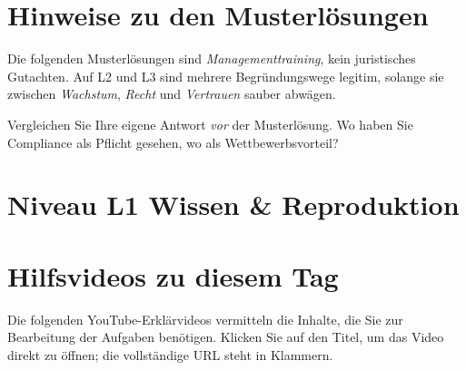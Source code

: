 \documentclass[11pt,a4paper,oneside]{article}
\begin{document}
\section*{Hinweise zu den Musterlösungen}
\thispagestyle{plain}

\noindent Die folgenden Musterlösungen sind \emph{Managementtraining}, kein juristisches Gutachten. Auf L2 und L3 sind mehrere Begründungswege legitim, solange sie zwischen \emph{Wachstum}, \emph{Recht} und \emph{Vertrauen} sauber abwägen.

\begin{infobox}
Vergleichen Sie Ihre eigene Antwort \emph{vor} der Musterlösung. Wo haben Sie Compliance als Pflicht gesehen, wo als Wettbewerbsvorteil?
\end{infobox}

\clearpage

\section*{Niveau L1 \textendash{} Wissen \& Reproduktion}

\section*{Hilfsvideos zu diesem Tag}
\thispagestyle{plain}

\noindent Die folgenden YouTube-Erkl\"arvideos vermitteln die Inhalte, die Sie zur Bearbeitung der Aufgaben ben\"otigen. Klicken Sie auf den Titel, um das Video direkt zu \"offnen; die vollst\"andige URL steht in Klammern.
\end{document}

